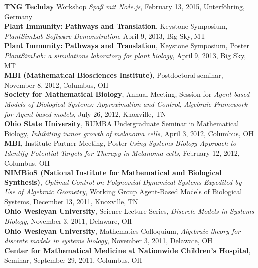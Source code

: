 \documentclass[10pt]{article}
\begin{document}
  \textbf{TNG Techday} Workshop \textit{Spa{\ss} mit Node.js}, February 13, 2015, Unterf\"ohring, Germany\\

  \textbf{Plant Immunity: Pathways and Translation}, Keystone Symposium, {\it 
  PlantSimLab Software Demonstration}, April 9, 2013, Big Sky, MT\\

  \textbf{Plant Immunity: Pathways and Translation}, Keystone Symposium, Poster {\it PlantSimLab: a simulations laboratory for plant biology}, April 9, 2013, Big Sky, MT\\

  \textbf{MBI (Mathematical Biosciences Institute)}, Postdoctoral seminar, November 8, 2012, Columbus, OH\\

  \textbf{Society for Mathematical Biology}, Annual Meeting, Session for {\it Agent-based Models of Biological Systems: Approximation and Control}, {\it Algebraic Framework for Agent-based models}, July 26, 2012, Knoxville, TN\\

  \textbf{Ohio State University}, RUMBA Undergraduate Seminar in Mathematical Biology, {\it Inhibiting tumor growth of melanoma cells}, April 3, 2012, Columbus, OH\\

  \textbf{MBI}, Institute Partner Meeting, Poster {\it Using Systems Biology Approach to Identify Potential Targets for Therapy in Melanoma cells}, February 12, 2012, Columbus, OH\\

  \textbf{NIMBioS (National Institute for Mathematical and Biological Synthesis)}, {\it Optimal Control on Polynomial Dynamical Systems Expedited by Use of Algebraic Geometry}, Working Group Agent-Based Models of Biological Systems, December 13, 2011, Knoxville, TN\\

  \textbf{Ohio Wesleyan University}, Science Lecture Series, {\it Discrete Models in Systems Biology}, November 3, 2011, Delaware, OH\\

  \textbf{Ohio Wesleyan University}, Mathematics Colloquium, {\it Algebraic theory for discrete models in systems biology}, November 3, 2011, Delaware, OH\\

  \textbf{Center for Mathematical Medicine at Nationwide Children's Hospital}, Seminar, September 29, 2011, Columbus, OH\\
\end{document}

